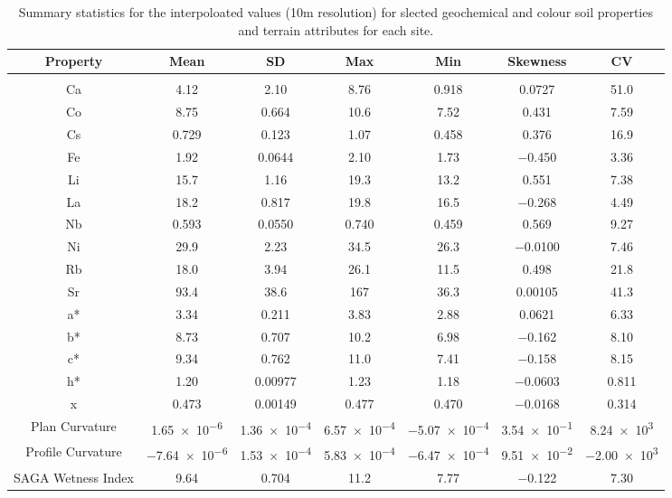 \documentclass[
  number]{elsarticle}
\begin{document}
\begin{longtable}[]{@{}ccccccc@{}}

\caption{\label{tbl-univariate2-summary}Summary statistics for the
interpoloated values (10m resolution) for slected geochemical and colour
soil properties and terrain attributes for each site.}

\tabularnewline

\toprule\noalign{}
Property & Mean & SD & Max & Min & Skewness & CV \\
\midrule\noalign{}
\endhead
\bottomrule\noalign{}
\endlastfoot
\multicolumn{7}{@{}c@{}}{%
Agriculture} \\
Ca & 4.12 & 2.10 & 8.76 & 0.918 & 0.0727 & 51.0 \\
Co & 8.75 & 0.664 & 10.6 & 7.52 & 0.431 & 7.59 \\
Cs & 0.729 & 0.123 & 1.07 & 0.458 & 0.376 & 16.9 \\
Fe & 1.92 & 0.0644 & 2.10 & 1.73 & −0.450 & 3.36 \\
Li & 15.7 & 1.16 & 19.3 & 13.2 & 0.551 & 7.38 \\
La & 18.2 & 0.817 & 19.8 & 16.5 & −0.268 & 4.49 \\
Nb & 0.593 & 0.0550 & 0.740 & 0.459 & 0.569 & 9.27 \\
Ni & 29.9 & 2.23 & 34.5 & 26.3 & −0.0100 & 7.46 \\
Rb & 18.0 & 3.94 & 26.1 & 11.5 & 0.498 & 21.8 \\
Sr & 93.4 & 38.6 & 167 & 36.3 & 0.00105 & 41.3 \\
a* & 3.34 & 0.211 & 3.83 & 2.88 & 0.0621 & 6.33 \\
b* & 8.73 & 0.707 & 10.2 & 6.98 & −0.162 & 8.10 \\
c* & 9.34 & 0.762 & 11.0 & 7.41 & −0.158 & 8.15 \\
h* & 1.20 & 0.00977 & 1.23 & 1.18 & −0.0603 & 0.811 \\
x & 0.473 & 0.00149 & 0.477 & 0.470 & −0.0168 & 0.314 \\
Plan Curvature & 1.65~×~10\textsuperscript{−6} &
1.36~×~10\textsuperscript{−4} & 6.57~×~10\textsuperscript{−4} &
−5.07~×~10\textsuperscript{−4} & 3.54~×~10\textsuperscript{−1} &
8.24~×~10\textsuperscript{3} \\
Profile Curvature & −7.64~×~10\textsuperscript{−6} &
1.53~×~10\textsuperscript{−4} & 5.83~×~10\textsuperscript{−4} &
−6.47~×~10\textsuperscript{−4} & 9.51~×~10\textsuperscript{−2} &
−2.00~×~10\textsuperscript{3} \\
SAGA Wetness Index & 9.64 & 0.704 & 11.2 & 7.77 & −0.122 & 7.30 \\

\end{longtable}
\end{document}
